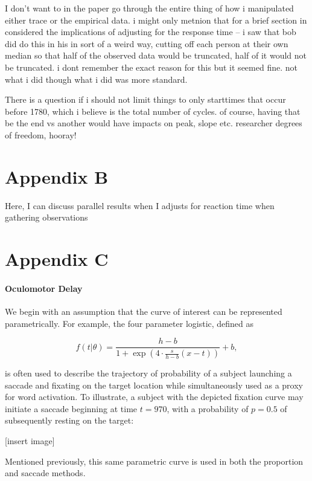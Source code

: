 \documentclass{article}
\begin{document}
I don't want to in the paper go through the entire thing of how i manipulated either trace or the empirical data. i might only metnion that for a brief section in considered the implications of adjusting for the response time -- i saw that bob did do this in his in sort of a weird way, cutting off each person at their own median so that half of the observed data would be truncated, half of it would not be truncated. i dont remember the  exact reason for this but it seemed fine. not what i did though what i did was more standard.

There is a question if i should not limit things to only starttimes that occur before 1780, which i believe is the total number of cycles. of course, having that be the end vs another would have impacts on peak, slope etc. researcher degrees of freedom, hooray! 

\section*{Appendix B}

Here, I can discuss parallel results when I adjusts for reaction time when gathering observations

\section*{Appendix C}

\paragraph{Oculomotor Delay}


We begin with an assumption that the curve of interest can be represented parametrically. For example, the four parameter logistic, defined as

$$
f(t|\theta) = \frac{h-b}{1 + \exp\left(4 \cdot \frac{s}{h-b}(x - t) \right)} +b,
$$ 

is often used to describe the trajectory of probability of a subject launching a saccade and fixating on the target location while simultaneously used as a proxy for word activation. To illustrate, a subject with the depicted fixation curve may initiate a saccade beginning at time $t = 970$, with a probability of $p = 0.5$ of subsequently resting on the target:

[insert image]


Mentioned previously, this same parametric curve is used in both the proportion and saccade methods.
\end{document}
